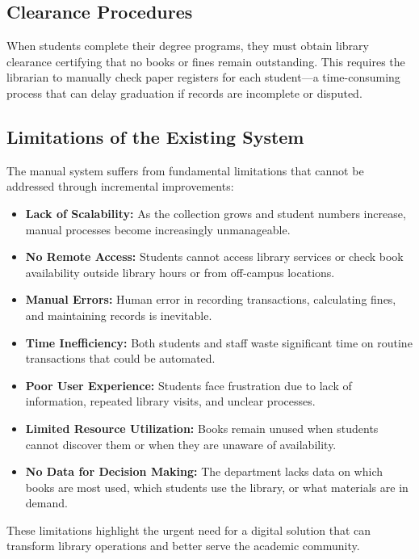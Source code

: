 \documentclass[12pt,a4paper]{report}
\begin{document}
\subsection{Clearance Procedures}

When students complete their degree programs, they must obtain library clearance certifying that no books or fines remain outstanding. This requires the librarian to manually check paper registers for each student—a time-consuming process that can delay graduation if records are incomplete or disputed.

\subsection{Limitations of the Existing System}

The manual system suffers from fundamental limitations that cannot be addressed through incremental improvements:

\begin{itemize}
    \item \textbf{Lack of Scalability:} As the collection grows and student numbers increase, manual processes become increasingly unmanageable.
    \item \textbf{No Remote Access:} Students cannot access library services or check book availability outside library hours or from off-campus locations.
    \item \textbf{Manual Errors:} Human error in recording transactions, calculating fines, and maintaining records is inevitable.
    \item \textbf{Time Inefficiency:} Both students and staff waste significant time on routine transactions that could be automated.

    \item \textbf{Poor User Experience:} Students face frustration due to lack of information, repeated library visits, and unclear processes.
    \item \textbf{Limited Resource Utilization:} Books remain unused when students cannot discover them or when they are unaware of availability.
    \item \textbf{No Data for Decision Making:} The department lacks data on which books are most used, which students use the library, or what materials are in demand.
\end{itemize}

These limitations highlight the urgent need for a digital solution that can transform library operations and better serve the academic community.
\end{document}
